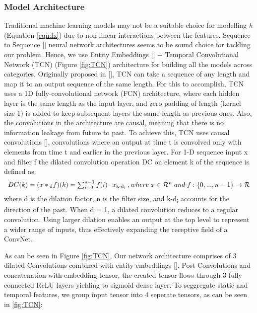 \subsubsection{Model Architecture}
Traditional machine learning models may not be a suitable choice for modelling \emph{h} (Equation \ref{eqn:fx}) due to 
non-linear interactions between the features. Sequence to Sequence [\cite{sutskever2014sequence}] neural network 
architectures seems to be sound choice for tackling our problem.
Hence, we use Entity Embeddings [\cite{guo2016entity}] + Temporal Convolutional Network (TCN) 
(Figure \ref{fig:TCN}) architecture for building all the models 
across categories. Originally proposed in [\cite{lea2016temporal}], TCN can take a sequence of any length and map it to an 
output sequence of the same length. For this to accomplish, TCN uses a 1D fully-convolutional network (FCN) architecture, 
where each hidden layer is the same length as the input layer, and zero padding of length (kernel size-1) is added to 
keep subsequent layers the same length as previous ones. Also, the convolutions in the architecture are causal, 
meaning that there is no information leakage from future to past. To achieve this, TCN uses causal convolutions [\cite{bai2018empirical}], 
convolutions where an output at time t is convolved only with elements from time t and earlier in the previous layer.
For 1-D sequence input x and filter f the dilated convolution operation DC on element k of the sequence is defined as:
  \begin{equation}
      \begin{array}{l}
        DC(k) = (x\ast \textsubscript{d}f)(k) =  \sum_{i=0}^{n-1}f(i)\cdot x\textsubscript{k-d\textsubscript{i}}
        \;, where \;
        x \in \mathcal{R}^n \;and\;
        f : \{0, . . . , n-1\} \to \mathcal{R}
      \end{array}
    \label{eqn:logloss}
  \end{equation}
where d is the dilation factor, n is the filter size, and k-d\textsubscript{i}
accounts for the direction of the past. When d = 1, a dilated convolution reduces to a
regular convolution. Using larger dilation enables an output
at the top level to represent a wider range of inputs, thus
effectively expanding the receptive field of a ConvNet.

As can be seen in Figure \ref{fig:TCN}, Our network architecture comprises of 3 dilated Convolutions combined with 
entity embeddings [\cite{guo2016entity}]. Post Convolutions and concatenation with embedding tensor, the created tensor flows through 
3 fully connected ReLU layers yielding to sigmoid dense layer. To seggregate static and temporal
features, we group input tensor into 4 seperate tensors, as can be seen in \ref{fig:TCN}:

